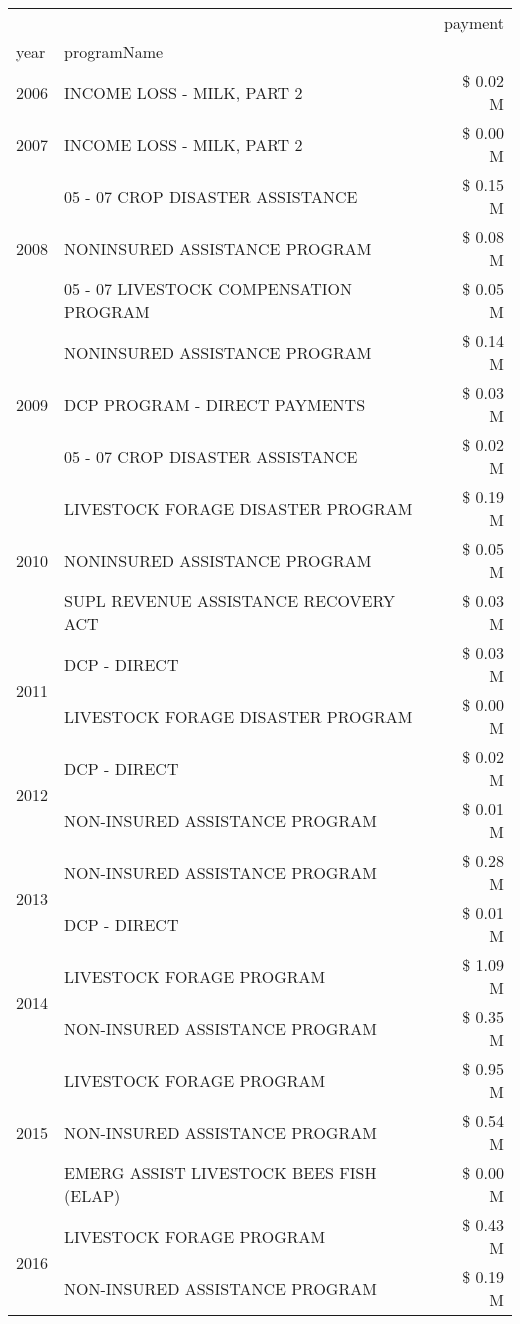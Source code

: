 \begin{tabular}{llr}
\toprule
 &  & payment \\
year & programName &  \\
\midrule
2006 & INCOME LOSS - MILK, PART 2 & \$ 0.02 M \\
\cline{1-3}
2007 & INCOME LOSS - MILK, PART 2 & \$ 0.00 M \\
\cline{1-3}
\multirow[t]{3}{*}{2008} & 05 - 07 CROP DISASTER ASSISTANCE & \$ 0.15 M \\
 & NONINSURED ASSISTANCE PROGRAM & \$ 0.08 M \\
 & 05 - 07 LIVESTOCK COMPENSATION PROGRAM & \$ 0.05 M \\
\cline{1-3}
\multirow[t]{3}{*}{2009} & NONINSURED ASSISTANCE PROGRAM & \$ 0.14 M \\
 & DCP PROGRAM - DIRECT PAYMENTS & \$ 0.03 M \\
 & 05 - 07 CROP DISASTER ASSISTANCE & \$ 0.02 M \\
\cline{1-3}
\multirow[t]{3}{*}{2010} & LIVESTOCK FORAGE DISASTER  PROGRAM & \$ 0.19 M \\
 & NONINSURED ASSISTANCE PROGRAM & \$ 0.05 M \\
 & SUPL REVENUE ASSISTANCE RECOVERY ACT & \$ 0.03 M \\
\cline{1-3}
\multirow[t]{2}{*}{2011} & DCP - DIRECT & \$ 0.03 M \\
 & LIVESTOCK FORAGE DISASTER PROGRAM & \$ 0.00 M \\
\cline{1-3}
\multirow[t]{2}{*}{2012} & DCP - DIRECT & \$ 0.02 M \\
 & NON-INSURED ASSISTANCE PROGRAM & \$ 0.01 M \\
\cline{1-3}
\multirow[t]{2}{*}{2013} & NON-INSURED ASSISTANCE PROGRAM & \$ 0.28 M \\
 & DCP - DIRECT & \$ 0.01 M \\
\cline{1-3}
\multirow[t]{2}{*}{2014} & LIVESTOCK FORAGE PROGRAM & \$ 1.09 M \\
 & NON-INSURED ASSISTANCE PROGRAM & \$ 0.35 M \\
\cline{1-3}
\multirow[t]{3}{*}{2015} & LIVESTOCK FORAGE PROGRAM & \$ 0.95 M \\
 & NON-INSURED ASSISTANCE PROGRAM & \$ 0.54 M \\
 & EMERG ASSIST LIVESTOCK BEES FISH (ELAP) & \$ 0.00 M \\
\cline{1-3}
\multirow[t]{3}{*}{2016} & LIVESTOCK FORAGE PROGRAM                      & \$ 0.43 M \\
 & NON-INSURED ASSISTANCE PROGRAM                & \$ 0.19 M \\

\end{tabular}
